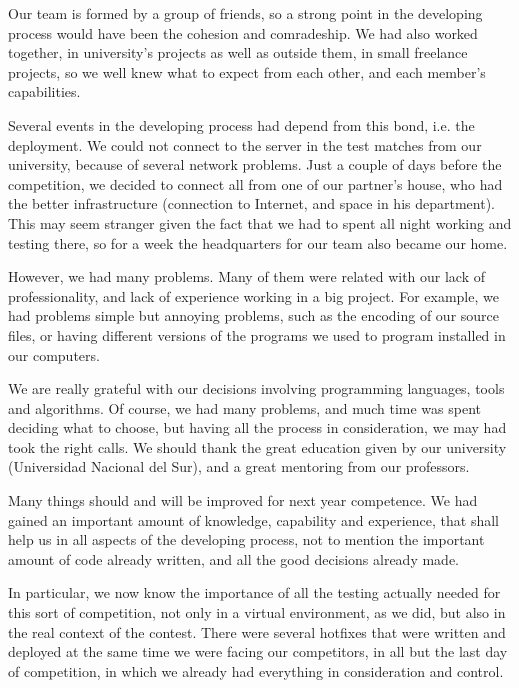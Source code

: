 \documentclass{llncs2e/llncs}
\begin{document}
    Our team is formed by a group of friends, so a strong point in the developing 
    process would have been the cohesion and comradeship. We had also worked 
    together, in university's projects as well as outside them, in small freelance 
    projects, so we well knew what to expect from each other, and each member's 
    capabilities. 

    Several events in the developing process had depend from this bond, i.e. the 
    deployment. We could not connect to the server in the test matches from our 
    university, because of several network problems. Just a couple of days before 
    the competition, we decided to connect all from one of our partner's house, 
    who had the better infrastructure (connection to Internet, and space in his 
    department). This may seem stranger given the fact that we had to spent all 
    night working and testing there, so for a week the headquarters for our team 
    also became our home.

    However, we had many problems. Many of them were related with our lack of 
    professionality, and lack of experience working in a big project. For example, 
    we had problems simple but annoying problems, such as the encoding of our 
    source files, or having different versions of the programs we used to program
    installed in our computers.

    We are really grateful with our decisions involving programming languages, 
    tools and algorithms. Of course, we had many problems, and much time was spent 
    deciding what to choose, but having all the process in consideration, we may 
    had took the right calls. We should thank the great education given by our 
    university (Universidad Nacional del Sur), and a great mentoring from our 
    professors.

    Many things should and will be improved for next year competence. We had 
    gained an important amount of knowledge, capability and experience, that shall 
    help us in all aspects of the developing process, not to mention the 
    important amount of code already written, and all the good decisions already 
    made.

    In particular, we now know the importance of all the testing actually needed 
    for this sort of competition, not only in a virtual environment, as we did, 
    but also in the real context of the contest. There were several hotfixes that 
    were written and deployed at the same time we were facing our competitors, in 
    all but the last day of competition, in which we already had everything in 
    consideration and control.
\end{document}
